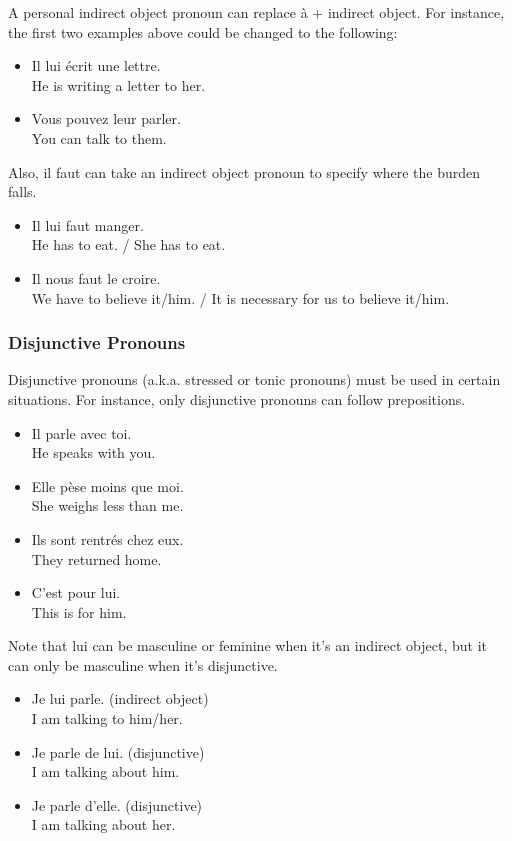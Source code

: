 A personal indirect object pronoun can replace {\`a} + indirect object. For instance, the first two examples above could be changed to the following:

\begin{itemize}
  \item  Il lui {\'e}crit une lettre. \\ He is writing a letter to her.
	\item  Vous pouvez leur parler. \\ You can talk to them.
\end{itemize}

Also, il faut can take an indirect object pronoun to specify where the burden falls.

\begin{itemize}
  \item  Il lui faut manger. \\ He has to eat. / She has to eat.
	\item  Il nous faut le croire. \\ We have to believe it/him. / It is necessary for us to believe it/him.
\end{itemize}

\subsubsection{Disjunctive Pronouns}

Disjunctive pronouns (a.k.a. stressed or tonic pronouns) must be used in certain situations. For instance, only disjunctive pronouns can follow prepositions.

\begin{itemize}
  \item  Il parle avec toi. \\ He speaks with you.
	\item  Elle p{\`e}se moins que moi. \\ She weighs less than me.
	\item  Ils sont rentr{\'e}s chez eux. \\ They returned home.
	\item  C'est pour lui. \\ This is for him.
\end{itemize}

Note that lui can be masculine or feminine when it's an indirect object, but it can only be masculine when it's disjunctive.

\begin{itemize}
  \item  Je lui parle. (indirect object) \\ I am talking to him/her.
	\item  Je parle de lui. (disjunctive) \\ I am talking about him.
	\item  Je parle d'elle. (disjunctive) \\ I am talking about her.
\end{itemize}

